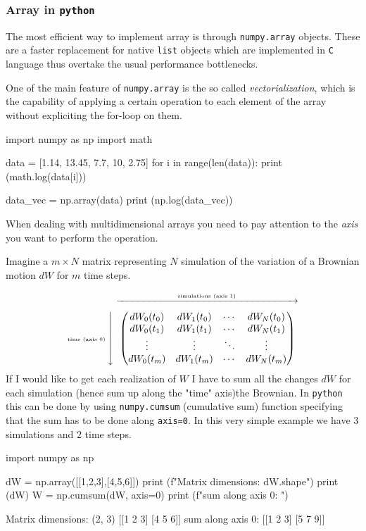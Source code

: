\documentclass[12pt,a4paper]{book}
\newcommand{\mymatrix}[1]{\ensuremath{\left\downarrow\vphantom{#1}\right.\overset{\xrightarrow[\hphantom{#1}]{\text{simulations (axis 1)}}}{#1}}}
\begin{document}
\subsubsection{Array in \texttt{python}}

The most efficient way to implement array is through \texttt{numpy.array} objects. These are a faster replacement for native \texttt{list} objects which are implemented in \texttt{C} language thus overtake the usual performance bottlenecks. 

One of the main feature of \texttt{numpy.array} is the so called \emph{vectorialization}, which is the capability of applying a certain operation to each element of the array without expliciting the for-loop on them.
\begin{ipython}
import numpy as np
import math 

data = [1.14, 13.45, 7.7, 10, 2.75]
for i in range(len(data)):
	print (math.log(data[i]))
	
data_vec = np.array(data)
print (np.log(data_vec))
\end{ipython}

When dealing with multidimensional arrays you need to pay attention to the \emph{axis} you want to perform the operation.

Imagine a $m\times N$ matrix representing $N$ simulation of the variation of a Brownian motion $dW$ for $m$ time steps.

\begin{equation}
	\text{\tiny time (axis 0)}\mymatrix{\begin{pmatrix}
			dW_0(t_0) & dW_1(t_0) & \cdots & dW_N(t_0) \\
			dW_0(t_1) & dW_1(t_1) & \cdots & dW_N(t_1) \\
			\vdots  & \vdots  & \ddots & \vdots  \\
			dW_0(t_m) & dW_1(t_m) & \cdots & dW_N(t_m)
	\end{pmatrix}}
\label{numpy_array}
\end{equation}
\vfill
If I would like to get each realization of $W$ I have to sum all the changes $dW$ for each simulation (hence sum up along the "time" axis)the Brownian. In \texttt{python} this can be done by using \texttt{numpy.cumsum} (cumulative sum) function specifying that the sum has to be done along \texttt{axis=0}. In this very simple example we have 3 simulations and 2 time steps.
\vfill

\begin{ipython}
import numpy as np

dW = np.array([[1,2,3],[4,5,6]])
print (f"Matrix dimensions: {dW.shape}")
print (dW)
W = np.cumsum(dW, axis=0)
print (f"sum along axis 0: ")
\end{ipython}
\begin{ioutput}
Matrix dimensions: (2, 3)
[[1 2 3]
[4 5 6]]
sum along axis 0: 
[[1 2 3]
[5 7 9]]
\end{ioutput}
\end{document}
